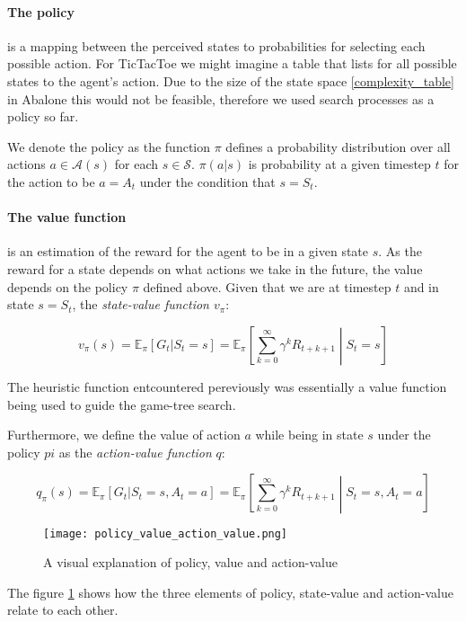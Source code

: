 \paragraph{The policy} is a mapping between the perceived states to probabilities for selecting each possible action. For TicTacToe we might imagine a table that lists for all possible states to the agent's action. Due to the size of the state  space \ref{complexity_table} in Abalone this would not be feasible, therefore we used search processes as a policy so far.

We denote the policy as the function $\pi $ defines a probability distribution over all actions $ a \in \mathcal{A}(s)$ for each $ s \in \mathcal{S} $. $ \pi(a|s)$ is probability at a given timestep $t$ for the action to be $ a = A_t $ under the condition that $ s = S_t $.

\paragraph{The value function} is an estimation of the reward for the agent to be in a given state $ s $.  As the reward for a state depends on what actions we take in the future, the value depends on the policy $ \pi $ defined above. Given that we are at timestep $ t $ and in state $ s = S_t $, the \textit{state-value function $v_{\pi}$}:

$$ v_{\pi}(s) = \mathbb{E}_{\pi}[G_t | S_t = s] = \mathbb{E}_{\pi}\left[\sum_{k=0}^{\infty} \gamma^kR_{t+k+1} \middle| S_t = s \right] $$

The heuristic function entcountered pereviously was essentially a value function being used to guide the game-tree search.

Furthermore, we define the value of action $a$ while being in state $s$ under the policy $pi$ as the \textit{action-value function} $q$:

$$ q_{\pi}(s) = \mathbb{E}_{\pi}[G_t | S_t = s, A_t = a] = \mathbb{E}_{\pi}\left[\sum_{k=0}^{\infty} \gamma^kR_{t+k+1} \middle| S_t = s, A_t = a \right] $$

\begin{figure}
    \centering
    \texttt{[image: policy\_value\_action\_value.png]}
    \caption{A visual explanation of policy, value and action-value \cite[p.62]{sutton_reinforcement_2018}}
    \label{policy_value_action_value}
\end{figure}

The figure \ref{policy_value_action_value} shows how the three elements of policy, state-value and action-value relate to each other.

